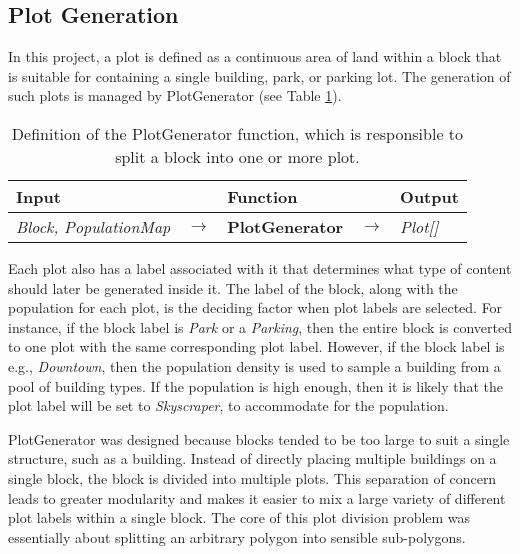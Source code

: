 \subsection{Plot Generation}  

In this project, a plot is defined as a continuous area of land within a block that is suitable for containing a single building, park, or parking lot.
The generation of such plots is managed by PlotGenerator (see Table \ref{table:plotgen}).

\begin{table}[H]
  \centering
  \begin{tabular}{lllll}
    \textbf{Input}                           &               & \textbf{Function}            &               & \textbf{Output}         \\
    \midrule
    \textit{Block, PopulationMap}            & $\rightarrow$ & \textbf{PlotGenerator}       & $\rightarrow$ & \textit{Plot[]}         \\
    \bottomrule
  \end{tabular}

  \caption{Definition of the PlotGenerator function, which is responsible to split a block into one or more plot.}
  \label{table:plotgen}
\end{table}
\vspace{-0.4cm} 

Each plot also has a label associated with it that determines what type of content should later be generated inside it. 
The label of the block, along with the population for each plot, is the deciding factor when plot labels are selected. 
For instance, if the block label is \textit{Park} or a \textit{Parking}, then the entire block is converted to one plot with the same corresponding plot label. 
However, if the block label is e.g., \textit{Downtown}, then the population density is used to sample a building from a pool of building types. 
If the population is high enough, then it is likely that the plot label will be set to \textit{Skyscraper}, to accommodate for the population. 

PlotGenerator was designed because blocks tended to be too large to suit a single structure, such as a building.
Instead of directly placing multiple buildings on a single block, the block is divided into multiple plots.
This separation of concern leads to greater modularity and makes it easier to mix a large variety of different plot labels within a single block.
The core of this plot division problem was essentially about splitting an arbitrary polygon into sensible sub-polygons. 

